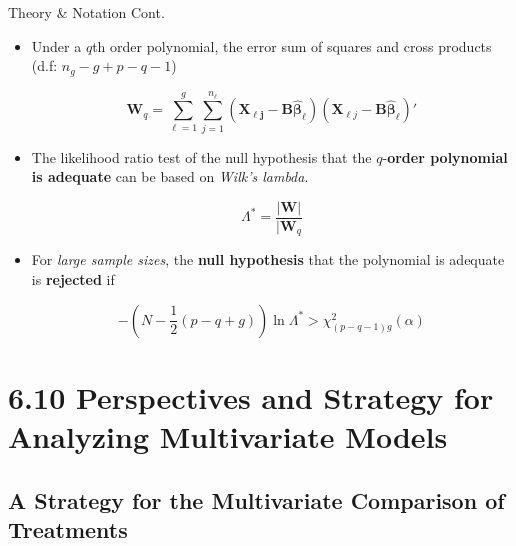 \documentclass[8pt]{beamer}
\begin{document}
\begin{frame}{Theory \& Notation Cont.}
    \begin{itemize}
        \item Under a $q$th order polynomial, the error sum of squares and cross products (d.f: $n_{g} - g + p - q - 1$)
        
        \begin{equation}
            \mathbf{W}_{q} = \sum_{\ell = 1}^{g}\sum_{j = 1}^{n_{\ell}}(\mathbf{X_{\ell j}} - \mathbf{B}\mathbf{\hat{\beta}_{\ell}})(\mathbf{X}_{\ell j} - \mathbf{B}\mathbf{\hat{\beta}_{\ell}})'
        \end{equation}
        
        \item The likelihood ratio test of the null hypothesis that the $q$-\textbf{order polynomial is adequate} can be based on \textit{Wilk's lambda}.
        
        \begin{equation}
            \Lambda^{*} = \frac{|\mathbf{W}|}{|\mathbf{W}_{q}}
        \end{equation}
        
        \item For \textit{large sample sizes}, the \textbf{null hypothesis} that the polynomial is adequate is \textbf{rejected} if
        
        \begin{equation}
            -\left(N - \frac{1}{2}(p - q + g)\right) \ln{\Lambda^{*}} > \chi^{2}_{(p-q-1)g}(\alpha)
        \end{equation}
        
    \end{itemize}
\end{frame}

\section{6.10 Perspectives and Strategy for Analyzing Multivariate Models}

\subsection{A Strategy for the Multivariate Comparison of Treatments}
\end{document}
